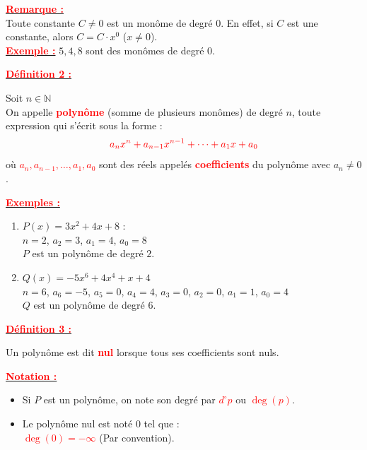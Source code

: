 \documentclass[12pt,a4paper]{article}
\begin{document}
\textbf{\underline{\textcolor{red}{Remarque :}}} \\
Toute constante $C \neq 0$ est un monôme de degré $0$. En effet, si $C$ est une constante, alors $C = C \cdot x^0$ ($x \neq 0$). \\
\textbf{\underline{\textcolor{red}{Exemple :}}} $5, 4, 8$ sont des monômes de degré $0$.

\vspace{0.5cm}

\textbf{\underline{\textcolor{red}{Définition 2 :}}} 

Soit $n \in \mathbb{N}$ \\
On appelle \textbf{\textcolor{red}{polynôme}} (somme de plusieurs monômes) de degré $n$, toute expression qui s'écrit sous la forme :
\[ \textcolor{red}{a_n x^n + a_{n-1} x^{n-1} + \dots + a_1 x + a_0} \]
où \textcolor{red}{$a_n, a_{n-1}, \dots, a_1, a_0$} sont des réels appelés \textbf{\textcolor{red}{coefficients}} du polynôme avec $a_n \neq 0$.

\textbf{\underline{\textcolor{red}{Exemples :}}}

\begin{enumerate}
    \item $P(x) = 3x^2 + 4x + 8$ : \\
    $n = 2$, $a_2 = 3$, $a_1 = 4$, $a_0 = 8$ \\
    $P$ est un polynôme de degré $2$.
    
    \item $Q(x) = -5x^6 + 4x^4 + x + 4$ \\
    $n = 6$, $a_6 = -5$, $a_5 = 0$, $a_4 = 4$, $a_3 = 0$, $a_2 = 0$, $a_1 = 1$, $a_0 = 4$ \\
    $Q$ est un polynôme de degré $6$.
\end{enumerate}

\vspace{0.5cm}

\textbf{\underline{\textcolor{red}{Définition 3 :}}} 

Un polynôme est dit \textbf{\textcolor{red}{nul}} lorsque tous ses coefficients sont nuls.

\textbf{\underline{\textcolor{red}{Notation :}}}

\begin{itemize}
    \item[i)] Si $P$ est un polynôme, on note son degré par \textcolor{red}{$d^{\circ}p$} ou \textcolor{red}{$\deg(p)$}.
    \item[ii)] Le polynôme nul est noté $0$ tel que : \\
    \textcolor{red}{$\deg(0) = -\infty$} (Par convention).
\end{itemize}
\end{document}
